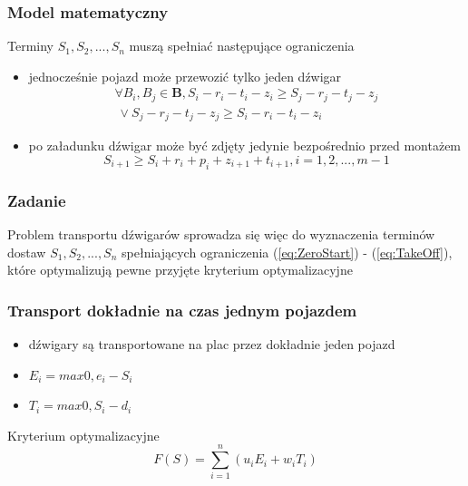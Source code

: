 \documentclass{beamer}
\begin{document}
 \begin{frame}
 \frametitle{Model matematyczny}
 
 \begin{block}{Terminy $S_1, S_2,...,S_n $ muszą spełniać następujące ograniczenia}
 \begin{itemize}
       \item jednocześnie pojazd może przewozić tylko jeden dźwigar
     \begin{equation}\label{eq:OneVehicle}
     \begin{split}
      \forall B_i, B_j \in \textbf{B}, S_i - r_i - t_i - z_i \ge S_j - r_j - t_j - z_j
      \\ \   \vee S_j - r_j - t_j - z_j \ge S_i - r_i - t_i - z_i
     \end{split}
     \end{equation}
     \item po załadunku dźwigar może być zdjęty jedynie bezpośrednio przed montażem
      \begin{equation}\label{eq:TakeOff}
      S_{i+1} \ge S_i + r_i + p_i + z_{i+1} + t_{i+1}, i = 1,2,...,m-1
      \end{equation}        
 \end{itemize}
 \end{block}
\end{frame}

\begin{frame}
 \frametitle{Zadanie}
 \begin{block}{}
 Problem transportu dźwigarów sprowadza się więc do wyznaczenia terminów dostaw $S_1, S_2,...,S_n $ spełniających ograniczenia (\ref{eq:ZeroStart})
 - (\ref{eq:TakeOff}), które optymalizują pewne przyjęte kryterium optymalizacyjne
  
 \end{block}
\end{frame}


\begin{frame}
 \frametitle{Transport dokładnie na czas jednym pojazdem}
 \begin{itemize}
  \item dźwigary są transportowane na plac przez dokładnie jeden pojazd
 \end{itemize}
 \begin{block}{}
 \begin{itemize}
 \item $ E_i = max{0, e_i - S_i} $ 
 \item $ T_i = max{0, S_i - d_i} $
 \end{itemize}
 \end{block}
 
 \begin{block}{Kryterium optymalizacyjne}
  \begin{equation}
   F(S) = \sum\limits_{i=1}^{n}(u_iE_i + w_iT_i) 
  \end{equation}
 \end{block}

\end{frame}
\end{document}
